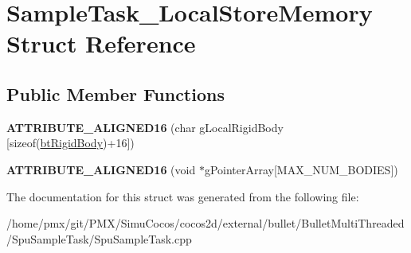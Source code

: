 \hypertarget{structSampleTask__LocalStoreMemory}{}\section{Sample\+Task\+\_\+\+Local\+Store\+Memory Struct Reference}
\label{structSampleTask__LocalStoreMemory}
\subsection*{Public Member Functions}
\begin{DoxyCompactItemize}
\item 
\mbox{\label{structSampleTask__LocalStoreMemory_a4a7040c53320cc588f668b03767286da}} 
{\bfseries A\+T\+T\+R\+I\+B\+U\+T\+E\+\_\+\+A\+L\+I\+G\+N\+E\+D16} (char g\+Local\+Rigid\+Body \mbox{[}sizeof(\hyperlink{classbtRigidBody}{bt\+Rigid\+Body})+16\mbox{]})
\item 
\mbox{\label{structSampleTask__LocalStoreMemory_a1dd7d674d2d513aff8284b61341cd968}} 
{\bfseries A\+T\+T\+R\+I\+B\+U\+T\+E\+\_\+\+A\+L\+I\+G\+N\+E\+D16} (void $\ast$g\+Pointer\+Array\mbox{[}M\+A\+X\+\_\+\+N\+U\+M\+\_\+\+B\+O\+D\+I\+ES\mbox{]})
\end{DoxyCompactItemize}


The documentation for this struct was generated from the following file\+:\begin{DoxyCompactItemize}
\item 
/home/pmx/git/\+P\+M\+X/\+Simu\+Cocos/cocos2d/external/bullet/\+Bullet\+Multi\+Threaded/\+Spu\+Sample\+Task/Spu\+Sample\+Task.\+cpp\end{DoxyCompactItemize}
